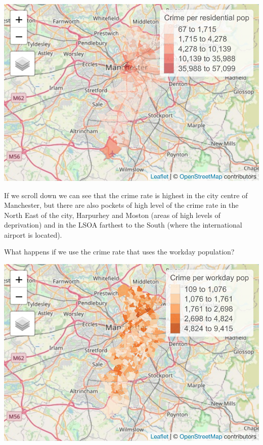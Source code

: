 \documentclass[
]{book}
\newenvironment{Shaded}{\begin{snugshade}}{\end{snugshade}}
\newcommand{\AttributeTok}[1]{\textcolor[rgb]{0.77,0.63,0.00}{#1}}
\newcommand{\FloatTok}[1]{\textcolor[rgb]{0.00,0.00,0.81}{#1}}
\newcommand{\FunctionTok}[1]{\textcolor[rgb]{0.00,0.00,0.00}{#1}}
\newcommand{\NormalTok}[1]{#1}
\newcommand{\SpecialCharTok}[1]{\textcolor[rgb]{0.00,0.00,0.00}{#1}}
\newcommand{\StringTok}[1]{\textcolor[rgb]{0.31,0.60,0.02}{#1}}
\begin{document}
\includegraphics{crime_mapping_files/figure-latex/unnamed-chunk-103-1.pdf}

If we scroll down we can see that the crime rate is highest in the city centre of Manchester, but there are also pockets of high level of the crime rate in the North East of the city, Harpurhey and Moston (areas of high levels of deprivation) and in the LSOA farthest to the South (where the international airport is located).

What happens if we use the crime rate that uses the workday population?

\begin{Shaded}
\end{Shaded}

\includegraphics{crime_mapping_files/figure-latex/unnamed-chunk-104-1.pdf}
\end{document}
